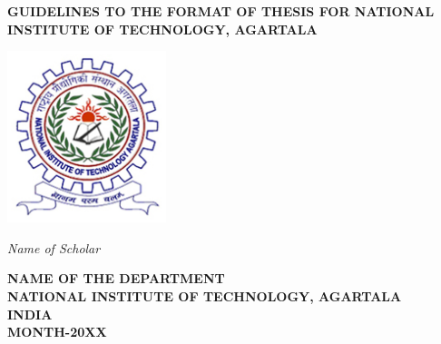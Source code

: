 \begin{center}
	{\Large \bf GUIDELINES TO THE FORMAT OF THESIS FOR NATIONAL INSTITUTE OF TECHNOLOGY, AGARTALA} 
\end{center}




\vspace*{5cm}
\begin{center}
	{\centering
\includegraphics[height=50mm]{nita.eps}}

\end{center}
\vspace*{5cm}
\begin{center}

	\vspace{-2 pt}
	\Large
	{\emph{Name of Scholar}} \\ 
\end{center}

\vspace{-0.5pt}
\large
\begin{center}
	{\bf NAME OF THE DEPARTMENT}\\
	{\bf NATIONAL INSTITUTE OF TECHNOLOGY, AGARTALA}\\
	{\bf INDIA}\\
	{\bf  MONTH-20XX}\\ 
\end{center}
	